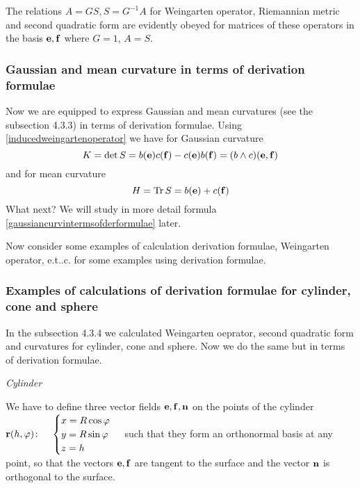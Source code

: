 \documentclass[12pt]{article}
\theoremstyle{theorem}
\numberwithin{equation}{section}
\begin{document}
{The relations $A=GS, S=G^{-1}A$ for Weingarten operator, Riemannian metric and second quadratic form
are evidently obeyed for matrices of these operators in the basis ${{\bf e},{\bf f}}$ where $G=1$, $A=S$.

\subsubsection{Gaussian and mean curvature in terms of derivation formulae}
Now we are equipped to express Gaussian and mean curvatures (see the subsection 4.3.3) in terms of derivation formulae.
  Using \eqref{inducedweingartenoperator} we have for Gaussian curvature
           \begin{equation}\label{gaussiancurvintermsofderformulae}
            K=\det S=b({\bf e})c({\bf f})-c({\bf e})b({\bf f})=(b\wedge c)({\bf e},{\bf f})
           \end{equation}
 and for mean curvature
   \begin{equation}\label{meancurvintermsofderformulae}
            H={\rm Tr\,} S=b({\bf e})+c({\bf f})
           \end{equation}
 What next? We will  study in more detail formula \eqref{gaussiancurvintermsofderformulae} later.

 Now consider some examples of calculation derivation formulae, Weingarten operator, e.t..c. for
 some examples using derivation formulae.

 \subsubsection {Examples of calculations of derivation formulae for cylinder, cone and sphere }

 In the subsection 4.3.4 we calculated Weingarten oeprator, second quadratic form and curvatures
 for cylinder, cone and sphere.
 Now we do the same but in terms of derivation formulae.
\m

 {\it Cylinder}

\m



We have to define three vector fields
${{\bf e},{\bf f},{\bf n}}$ on the points of the cylinder ${\bf r}(h,\varphi)\colon\quad
  \begin{cases}
  x=R\cos\varphi\\
  y=R\sin\varphi\\
  z=h\\
  \end{cases}$
such that they form an orthonormal basis at any point, so that the vectors ${\bf e},{\bf f}$ are tangent to the surface
   and  the vector ${\bf n}$ is orthogonal to the surface.

}
\end{document}
